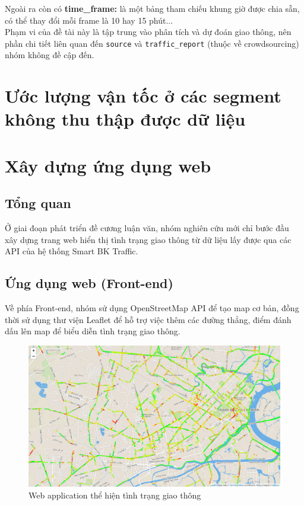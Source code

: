 Ngoài ra còn có \textbf{time\_frame:} là một bảng tham chiếu khung giờ được chia sẵn, có thể thay đổi mỗi frame là 10 hay 15 phút...\\

Phạm vi của đề tài này là tập trung vào phân tích và dự đoán giao thông, nên phần chi tiết liên quan đến \lstinline{source} và \lstinline{traffic_report} (thuộc về crowdsourcing) nhóm không đề cập đến.

\section{Ước lượng vận tốc ở các segment không thu thập được dữ liệu}

\section{Xây dựng ứng dụng web}
\subsection{Tổng quan}
Ở giai đoạn phát triển đề cương luận văn, nhóm nghiên cứu mới chỉ bước đầu xây dựng trang web hiển thị tình trạng giao thông từ dữ liệu lấy được qua các API của hệ thống Smart BK Traffic.
\subsection{Ứng dụng web (Front-end)}
Về phía Front-end, nhóm sử dụng OpenStreetMap API để tạo map cơ bản, đồng thời sử dụng thư viện Leaflet để hỗ trợ việc thêm các đường thẳng, điểm đánh dấu lên map để biểu diễn tình trạng giao thông.

\begin{figure}[!ht]
	\begin{center}
		\includegraphics[width=1.0\textwidth]{Traffic_Report/images/map.png}
	\end{center}
	\caption{Web application thể hiện tình trạng giao thông}
\end{figure}

